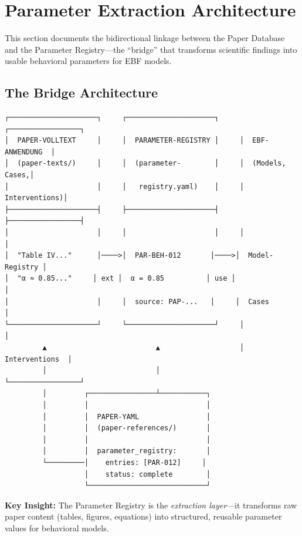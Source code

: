 
\section{Parameter Extraction Architecture}
\label{sec:paperint-parameter-extraction}

This section documents the bidirectional linkage between the Paper Database
and the Parameter Registry---the ``bridge'' that transforms scientific findings
into usable behavioral parameters for EBF models.

\subsection{The Bridge Architecture}

\begin{tcolorbox}[colback=blue!5!white, colframe=blue!75!black,
    title=Parameter Extraction: Paper $\rightarrow$ Registry $\rightarrow$ Models]

\begin{verbatim}
┌─────────────────────┐     ┌─────────────────────┐     ┌─────────────────┐
│  PAPER-VOLLTEXT     │     │  PARAMETER-REGISTRY │     │  EBF-ANWENDUNG  │
│  (paper-texts/)     │     │  (parameter-        │     │  (Models, Cases,│
│                     │     │   registry.yaml)    │     │   Interventions)│
├─────────────────────┤     ├─────────────────────┤     ├─────────────────┤
│                     │     │                     │     │                 │
│  "Table IV..."      │────>│  PAR-BEH-012       │────>│  Model-Registry │
│  "α ≈ 0.85..."     │ ext │  α = 0.85          │ use │                 │
│                     │     │  source: PAP-...   │     │  Cases          │
└─────────────────────┘     └─────────────────────┘     │                 │
         ▲                          ▲                   │  Interventions  │
         │                          │                   └─────────────────┘
         │         ┌────────────────┴───────────┐
         │         │                            │
         │         │  PAPER-YAML                │
         │         │  (paper-references/)       │
         │         │                            │
         │         │  parameter_registry:       │
         └─────────│    entries: [PAR-012]     │
                   │    status: complete        │
                   └────────────────────────────┘
\end{verbatim}

\textbf{Key Insight:} The Parameter Registry is the \textit{extraction layer}---it
transforms raw paper content (tables, figures, equations) into structured,
reusable parameter values for behavioral models.

\end{tcolorbox}

